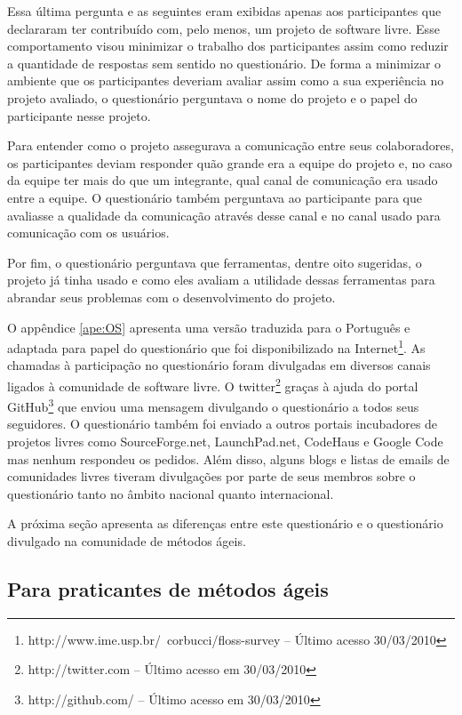 Essa última pergunta e as seguintes eram exibidas apenas aos
participantes que declararam ter contribuído com, pelo menos, um
projeto de software livre. Esse comportamento visou minimizar o
trabalho dos participantes assim como reduzir a quantidade de
respostas sem sentido no questionário. De forma a minimizar o ambiente
que os participantes deveriam avaliar assim como a sua experiência no
projeto avaliado, o questionário perguntava o nome do projeto e o
papel do participante nesse projeto.

Para entender como o projeto assegurava a comunicação entre seus
colaboradores, os participantes deviam responder quão grande era a
equipe do projeto e, no caso da equipe ter mais do que um integrante,
qual canal de comunicação era usado entre a equipe. O questionário
também perguntava ao participante para que avaliasse a qualidade da
comunicação através desse canal e no canal usado para comunicação com
os usuários.

Por fim, o questionário perguntava que ferramentas, dentre oito
sugeridas, o projeto já tinha usado e como eles avaliam a utilidade
dessas ferramentas para abrandar seus problemas com o desenvolvimento
do projeto.

O appêndice \ref{ape:OS} apresenta uma versão traduzida para o
Português e adaptada para papel do questionário que foi
disponibilizado na
Internet\footnote{http://www.ime.usp.br/~corbucci/floss-survey --
  Último acesso 30/03/2010}. As chamadas à participação no
questionário foram divulgadas em diversos canais ligados à comunidade
de software livre. O twitter\footnote{http://twitter.com -- Último
  acesso em 30/03/2010} graças à ajuda do portal
GitHub\footnote{http://github.com/ -- Último acesso em 30/03/2010} que
enviou uma mensagem divulgando o questionário a todos seus
seguidores. O questionário também foi enviado a outros portais
incubadores de projetos livres como SourceForge.net, LaunchPad.net,
CodeHaus e Google Code mas nenhum respondeu os pedidos. Além disso,
alguns blogs e listas de emails de comunidades livres tiveram
divulgações por parte de seus membros sobre o questionário tanto no
âmbito nacional quanto internacional.

A próxima seção apresenta as diferenças entre este questionário e o
questionário divulgado na comunidade de métodos ágeis.

\subsection{Para praticantes de métodos ágeis}
\label{subsec:agile}

